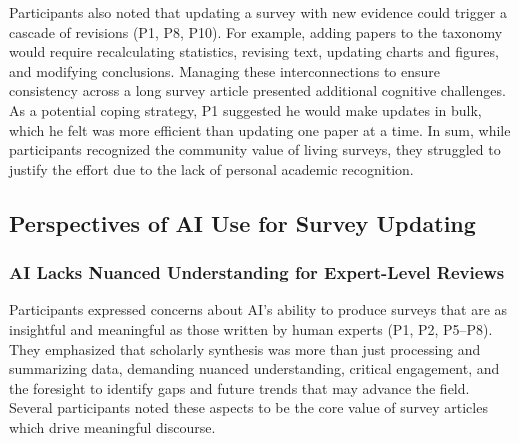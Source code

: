 Participants also noted that updating a survey with new evidence could trigger a cascade of revisions (P1, P8, P10). For example, adding papers to the taxonomy would require recalculating statistics, revising text, updating charts and figures, and modifying conclusions. Managing these interconnections to ensure consistency across a long survey article presented additional cognitive challenges. As a potential coping strategy, P1 suggested he would make updates in bulk, which he felt was more efficient than updating one paper at a time. In sum, while participants recognized the community value of living surveys, they struggled to justify the effort due to the lack of personal academic recognition.


\subsection{Perspectives of AI Use for Survey Updating}

\subsubsection{AI Lacks Nuanced Understanding for Expert-Level Reviews}
Participants expressed concerns about AI’s ability to produce surveys that are as insightful and meaningful as those written by human experts (P1, P2, P5--P8). They emphasized that scholarly synthesis was more than just processing and summarizing data, demanding nuanced understanding, critical engagement, and the foresight to identify gaps and future trends that may advance the field. Several participants noted these aspects to be the core value of survey articles which drive meaningful discourse.

